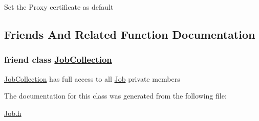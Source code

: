 Set the Proxy certificate as default 

\subsection{Friends And Related Function Documentation}
\hypertarget{classglite_1_1wmsui_1_1api_1_1Job_n0}{
\subsubsection[JobCollection]{\setlength{\rightskip}{0pt plus 5cm}friend class \hyperlink{classglite_1_1wmsui_1_1api_1_1JobCollection}{Job\-Collection}}}
\label{classglite_1_1wmsui_1_1api_1_1Job_n0}


\hyperlink{classglite_1_1wmsui_1_1api_1_1JobCollection}{Job\-Collection} has full access to all \hyperlink{classglite_1_1wmsui_1_1api_1_1Job}{Job} private members 

The documentation for this class was generated from the following file:\begin{CompactItemize}
\item 
\hyperlink{Job_8h}{Job.h}\end{CompactItemize}
